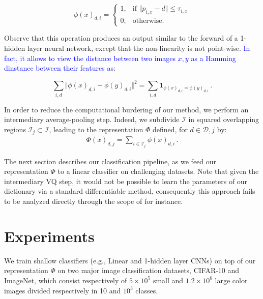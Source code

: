 \documentclass{article}
\newcommand{\Edouard}[1]{\textcolor{blue}{#1}}
\begin{document}
\begin{equation}
\label{encoding}
\phi(x)_{d,i}=
\begin{cases}
1,&\text{if } \Vert  p_{i,x} - d\Vert \leq \tau_{i,x}\\
0,&\text{otherwise}.
\end{cases}
\end{equation}






Observe that this operation produces an output similar to the forward of a 1-hidden layer neural network, except that the non-linearity is not point-wise. \Edouard{In fact, it allows to view the distance between two images $x,y$ as a Hamming dinstance between their features as}:

\[\sum_{i,d}\Vert \phi(x)_{d,i}-\phi(y)_{d,i}\Vert^2=\sum_{i,d}\mathbf{1}_{\phi(x)_{d,i}=\phi(y)_{d,i}}\,.\]

In order to reduce the computational burdering of our method, we perform an intermediary average-pooling step.
Indeed, we subdivide $\mathcal{I}$ in squared overlapping regions $\mathcal{I}_j\subset\mathcal{I}$, leading to the representation $\Phi$ defined, for $d\in\mathcal{D}, j$ by:
\begin{align}\Phi(x)_{d,j}= \sum_{i\in \mathcal{I}_j}\phi(x)_{d,i}\,.\end{align}

The next section describes our classification pipeline, as we feed our representation $\Phi$ to a linear classifier on challenging datasets. Note that given the intermediary VQ step, it would not be possible to learn the parameters of our dictionary via a standard differentiable method, consequently this approach fails to be analyzed directly through the scope of \cite{chizat2018global} for instance.




\section{Experiments}
\label{experiments}
We train  shallow classifiers (e.g., Linear and 1-hidden layer CNNs) on top of our representation $\Phi$ on two major  image classification datasets,  CIFAR-10 and ImageNet, which consist respectively of $5\times10^5$ small and $1.2\times10^6$ large color images  divided respectively in 10 and $10^3$ classes.
\end{document}

